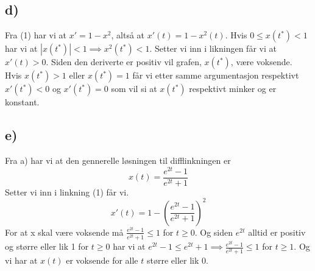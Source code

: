 \documentclass[a4paper, norsk, twoside, 10pt]{article}
\begin{document}
\subsection*{d)}
Fra (1) har vi at $x' = 1 - x^2$, altså at $x'(t) = 1- x^2(t)$. Hvis $0 \leq x(t^*) < 1$ har vi at $|x(t^*)| < 1 \implies x^2(t^*) < 1$. Setter vi inn i likningen får vi at $x'(t) > 0$. Siden den deriverte er positiv vil grafen, $x(t^*)$, være voksende. \\

Hvis $x(t^*) > 1 $ eller $x(t^*) = 1$ får vi etter samme argumentasjon respektivt $x'(t^*) < 0$ og $x'(t^*) = 0$ som vil si at $x(t^*)$ respektivt minker og er konstant.


\subsection*{e)}
Fra a) har vi at den gennerelle løsningen til difflinkningen er
\[  x(t) =  \frac{e^{2t} -1}{e^{2t} + 1} \]
Setter vi  inn i linkning (1) får vi.
\[x'(t) = 1 - \left(\frac{e^{2t} -1}{e^{2t} + 1}\right)^2 \]
For at x skal være voksende må $\frac{e^{2t} -1}{e^{2t} + 1} \leq 1$ for $t\geq0$. Og siden $e^{2t}$ alltid er positiv og større eller lik 1 for $t \geq 0$ har vi at $e^{2t} -1 \leq e^{2t} + 1 \implies \frac{e^{2t} -1}{e^{2t} + 1} \leq 1$  for $t \geq 1$. Og vi har at $x(t)$ er voksende for alle $t$ større eller lik 0.
\end{document}
